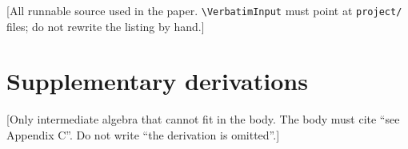\documentclass{swmcmthesis}
\begin{document}
[All runnable source used in the paper. \texttt{\textbackslash VerbatimInput}
must point at \texttt{project/} files; do not rewrite the listing by hand.]


\section{Supplementary derivations}

[Only intermediate algebra that cannot fit in the body. The body must cite
``see Appendix C''. Do not write ``the derivation is omitted''.]
\end{document}
